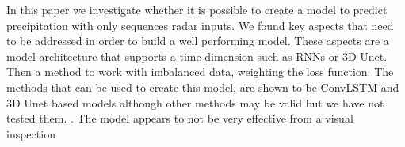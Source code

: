 In this paper we investigate whether it is possible to create
a model to predict precipitation with only sequences radar inputs.
We found key aspects that need to be addressed in order to build a well performing model.
These aspects are a model architecture that supports a time dimension such as RNNs or 3D Unet.
Then a method to work with imbalanced data, weighting the loss function.
The methods that can be used to create this model, are shown to be ConvLSTM and 3D Unet based models 
although other methods may be valid but we have not tested them.
.
The model appears to not be very effective from a visual inspection 